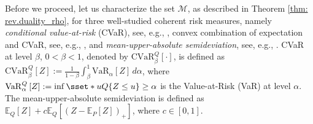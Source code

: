 \documentclass[final,onefignum,onetabnum]{class}
\newcommand{\ee}[2]{\mathbb{E}_{#1} \left[ #2 \right]}
\newcommand{\vvar}[2]{\mathrm{VaR}_{#1} \left[ #2 \right]}
\newcommand{\vvvar}[3]{\mathrm{VaR}^{#1}_{#2} \left[ #3 \right]}
\newcommand{\cccvar}[3]{\mathrm{CVaR}^{#1}_{#2} \left[ #3 \right]}
\newcommand{\bs}[1]{\boldsymbol{#1}} %
\newcommand{\Bs}[1]{\mathbb{#1}} %
\newcommand{\Cs}[1]{\mathcal{#1}} %
\newcommand{\Pspace}[1]{\left( \Xi, \Cs{F}, #1 \right)}
\begin{document}
Before we proceed, let us characterize the set $\Cs{M}$, as described in Theorem \ref{thm: rev.duality_rho},  for three well-studied coherent risk measures, namely  {\it conditional value-at-risk} (CVaR), see, e.g., \citet{rockafellar2000,rockafellar2002,rockafellar2007}, convex combination of expectation and CVaR, see, e.g., \citet{zhang2016}, and {\it mean-upper-absolute semideviation}, see, e.g., \citet{shapiro2014SP}. CVaR at level $\beta$,  $0<\beta<1$, denoted by $\cccvar{Q}{\beta}{\cdot}$, is defined as  $\cccvar{Q}{\beta}{Z}:=\frac{1}{1-\beta}\int_\beta^1 \vvar{\alpha}{Z}\,d\alpha$, where $\vvvar{Q}{\alpha}{Z}:=\inf\sset*{u}{Q\{Z \leq u\}\geq \alpha}$ is the Value-at-Risk (VaR) at level $\alpha$. The mean-upper-absolute semideviation is  defined as $\ee{Q}{Z} + c\ee{Q}{(Z-\ee{P}{Z})_{+}}$, where $c \in [0,1]$.
\begin{comment}
\begin{example}
    \label{ex: rev.CVaR_dual}
    Consider a probability space $\Pspace{Q}$ and $\Cs{Z}=L_{\infty}\Pspace{Q}$. Suppose that $\Xi$ is a finite space with $M$ atoms. %
    For a coherent risk measure $\rho$, we have $\rho(Z)= \sup_{\zeta \in \Cs{M}} \ \left \lbrace  \sum_{m=1}^{M} Z_{m} \zeta_{m} q_{m} \right \rbrace, \; \forall Z \in \Cs{Z}$,
    where $\Cs{M}$ is closed convex subset of $$\Cs{D}=\sset*{\bs{\zeta} \in \Bs{R}^{M}}{ \bs{\zeta}^{\top} \bs{q}=1, \;  \bs{\zeta} \ge \bs{0}}.$$ 
    \begin{itemize}
        \item When $\rho(Z)=\cccvar{Q}{\beta}{Z}$, we have $$\Cs{M}= \sset*{\bs{\zeta} \in \Cs{D}}{ \zeta_{m} \in [0, \frac{1}{1-\beta}], \; m=1, \ldots, M}.$$
        
        \item When $\rho(Z)=\ee{Q}{Z}+ \inf_{\tau \in \Bs{R}} \ \ee{Q}{(1-\gamma_{1})(\tau-Z)_{+} + (\gamma_{2}-1)(Z-\tau)_{+}}$, with $\gamma_{1} \in [0,1)$ and $\gamma_{2}>1$, we have 
        $$\Cs{M}= \sset*{\bs{\zeta} \in \Cs{D}}{ \zeta_{m} \in [\gamma_{1}, \gamma_{2} ], \; m=1, \ldots, M}.$$ 
        The above risk measure is also equivalent to $\gamma_{1} \ee{Q}{Z}+ (1-\gamma_{1})\cccvar{Q}{\beta}{Z}$, where $\beta:=\frac{1-\gamma_{1}}{\gamma_{2}-\gamma_{1}}$. 
        
        \item When $\rho(Z)=\ee{Q}{Z} + c\ee{Q}{(Z-\ee{P}{Z})_{+}}$, we have 
        $$\Cs{M}= \sset*{\bs{\zeta}^{\prime} \in \Cs{D}}{ \bs{\zeta}^{\prime}= 1 + \bs{\zeta} - \bs{\zeta}^{\top}\bs{q}, \; \|\bs{\zeta}\|_{\infty} \le c}.$$ 
        \qed
    \end{itemize}
    
\end{example}
\end{comment}
\end{document}
